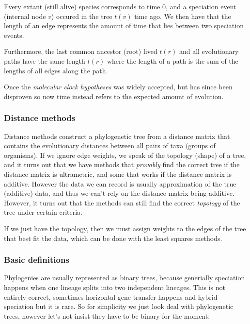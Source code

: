     Every extant (still alive) species corresponds to time $0$, and a 
    speciation event (internal node $v$) occured in the tree $t(v)$ time ago. 
    We then have that the length of an edge represents the amount of time that 
    lies between two speciation events.
    
    Furthermore, the last common ancestor (root) lived $t(r)$ and all 
    evolutionary paths have the same length $t(r)$ where the length of a path 
    is the sum of the lengths of all edges along the path.
    
    Once the \textit{molecular clock hypotheses} was widely accepted, but has 
    since been disproven so now time instead refers to the expected amount of 
    evolution.
    
    \subsubsection{Distance methods}
    Distance methods construct a phylogenetic tree from a distance matrix that 
    contains the evolutionary distances between all pairs of taxa (groups of 
    organisms). If we ignore edge weights, we speak of the topology (shape) of 
    a tree, and it turns out that we have methods that \textit{provably} find 
    the correct tree if the distance matrix is ultrametric, and some that works 
    if the distance matrix is additive. However the data we can record is 
    usually approximation of the true (additive) data, and thus we can't rely 
    on the distance matrix being additive. However, it turns out that the 
    methods can still find the correct \textit{topology} of the tree under 
    certain criteria.
    
    If we just have the topology, then we must assign weights to the edges of 
    the tree that best fit the data, which can be done with the least squares 
    methods.
    
    \subsubsection{Basic definitions}
    Phylogenies are usually represented as binary trees, because generially 
    speciation happens when one lineage splits into two independent lineages. 
    This is not entirely correct, sometimes horizontal gene-transfer happens 
    and hybrid speciation but it is rare. So for simplicity we just look deal 
    with phylogenetic trees, however let's not insist they have to be binary 
    for the moment:
    
